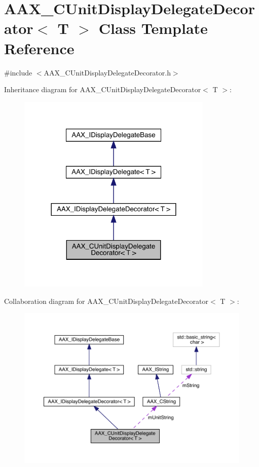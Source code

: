 \hypertarget{a01585}{}\section{A\+A\+X\+\_\+\+C\+Unit\+Display\+Delegate\+Decorator$<$ T $>$ Class Template Reference}
\label{a01585}


{\ttfamily \#include $<$A\+A\+X\+\_\+\+C\+Unit\+Display\+Delegate\+Decorator.\+h$>$}



Inheritance diagram for A\+A\+X\+\_\+\+C\+Unit\+Display\+Delegate\+Decorator$<$ T $>$\+:
\nopagebreak
\begin{figure}[H]
\begin{center}
\leavevmode
\includegraphics[width=264pt]{a01584}
\end{center}
\end{figure}


Collaboration diagram for A\+A\+X\+\_\+\+C\+Unit\+Display\+Delegate\+Decorator$<$ T $>$\+:
\nopagebreak
\begin{figure}[H]
\begin{center}
\leavevmode
\includegraphics[width=350pt]{a01583}
\end{center}
\end{figure}


